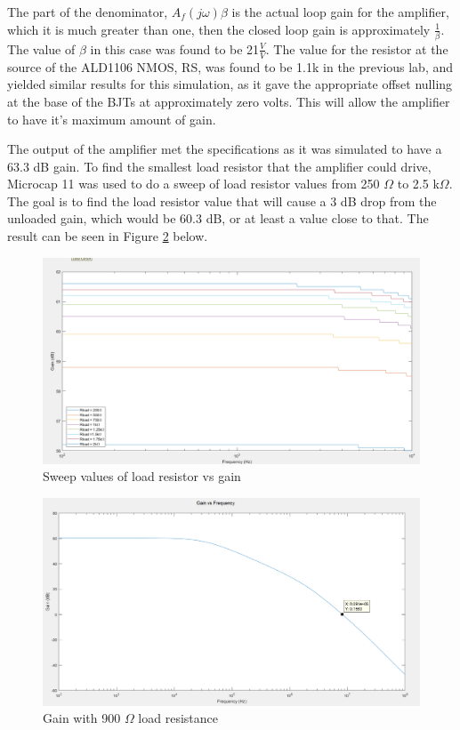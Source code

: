 The part of the denominator, $A_f(j\omega)\beta$ is the actual loop gain for the amplifier, which it is much greater than one, then the closed loop gain is approximately $\frac{1}{\beta}$. The value of $\beta$ in this case was found to be 21$\frac{V}{V} $. The value for the resistor at the source of the ALD1106 NMOS, RS, was found to be 1.1k in the previous lab, and yielded similar results for this simulation, as it gave the appropriate offset nulling at the base of the BJTs at approximately zero volts. This will allow the amplifier to have it's maximum amount of gain. 

The output of the amplifier met the specifications as it was simulated to have a 63.3 dB gain. To find the smallest load resistor that the amplifier could drive, Microcap 11 was used to do a sweep of load resistor values from 250 $\Omega$ to 2.5 k$\Omega$. The goal is to find the load resistor value that will cause a 3 dB drop from the unloaded gain, which would be 60.3 dB, or at least a value close to that. The result can be seen in Figure \ref{fig:loadsweep} below.

\begin{figure}[H]
	\centering
	\includegraphics[width=0.7\linewidth]{CircuitDevelopment/varyrload.png}
	\caption{Sweep values of load resistor vs gain}
	\label{fig:loadsweep}
\end{figure}





\begin{figure}[H]
	\centering
	\includegraphics[width=0.7\linewidth]{CircuitDevelopment/gainfreqsim.png}
	\caption{Gain with 900 $\Omega$ load resistance}
	\label{fig:loadsweep}
\end{figure}



